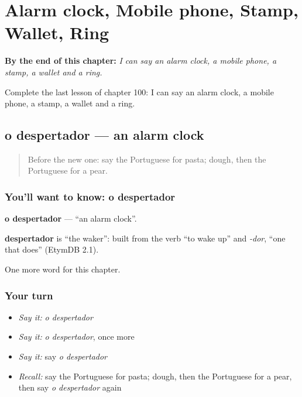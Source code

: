 
\chapter{Alarm clock, Mobile phone, Stamp, Wallet, Ring}
\label{ch:pt-alarm-clock-mobile-phone-stamp-wallet-ring}

\begin{chapteropening}
\textbf{By the end of this chapter:} \emph{I can say an alarm clock, a mobile phone, a stamp, a wallet and a ring.}

Complete the last lesson of chapter 100: I can say an alarm clock, a mobile phone, a stamp, a wallet and a ring.
\end{chapteropening}

\section[o despertador]{o despertador — an alarm clock}

\label{lesson:PT-C100-despertador}



\begin{quote}
Before the new one: say the Portuguese for pasta; dough, then the Portuguese for a pear.
\end{quote}

\subsection*{You'll want to know: o despertador}
\textbf{o despertador} — \textquotedblleft{}an alarm clock\textquotedblright{}.

\begin{cousinweb}
\textbf{despertador} is \textquotedblleft{}the waker\textquotedblright{}: built from the verb \textquotedblleft{}to wake up\textquotedblright{} and \emph{-dor}, \textquotedblleft{}one that does\textquotedblright{} (EtymDB 2.1).
\end{cousinweb}

\begin{grammarlens}[title={What you've built}]
One more word for this chapter.
\end{grammarlens}

\subsection*{Your turn}
\begin{itemize}
\raggedright
  \item \emph{Say it:} \emph{o despertador}
  \item \emph{Say it:} \emph{o despertador}, once more
  \item \emph{Say it:} say \emph{o despertador}
  \item \emph{Recall:} say the Portuguese for pasta; dough, then the Portuguese for a pear, then say \emph{o despertador} again
\end{itemize}

